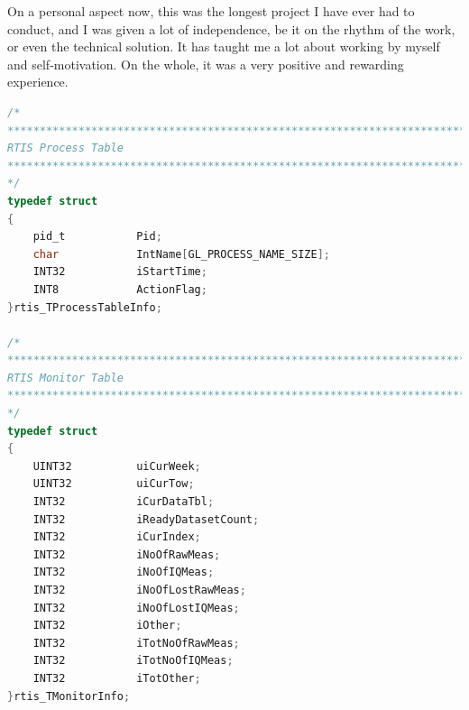 \documentclass{themeensg}
\newlength\longest
\begin{document}
	On a personal aspect now, this was the longest project I have ever had to conduct, and I was given a lot of independence, be it on the rhythm of the work, or even the technical solution. It has taught me a lot about working by myself and self-motivation. On the whole, it was a very positive and rewarding experience.
	  
  \vspace{1.5cm}

\newevenpage
\begin{appendices}
\label{beginappendices}

\label{structures}

\begin{lstlisting}[language=C]
/*
*******************************************************************************
RTIS Process Table
*******************************************************************************
*/
typedef struct
{
	pid_t 			Pid;
	char	 	   	IntName[GL_PROCESS_NAME_SIZE];
	INT32			iStartTime;
	INT8 			ActionFlag;
}rtis_TProcessTableInfo;

/*
*******************************************************************************
RTIS Monitor Table
*******************************************************************************
*/
typedef struct
{
	UINT32			uiCurWeek;
	UINT32			uiCurTow;
	INT32			iCurDataTbl;
	INT32			iReadyDatasetCount;
	INT32			iCurIndex;
	INT32			iNoOfRawMeas;
	INT32			iNoOfIQMeas;
	INT32			iNoOfLostRawMeas;
	INT32			iNoOfLostIQMeas;
	INT32			iOther;
	INT32			iTotNoOfRawMeas;
	INT32			iTotNoOfIQMeas;
	INT32			iTotOther;
}rtis_TMonitorInfo;


\end{lstlisting}

\label{configfile}



\label{SOW}


\label{satref}



\end{appendices}
\end{document}
